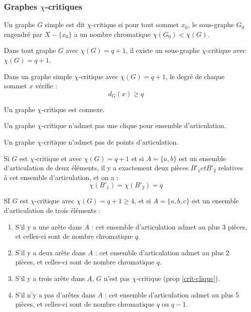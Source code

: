 \subsubsection{Graphes $\chi$-critiques}
\setcounter{prop}{0}

\begin{defin}
Un graphe $G$ simple est dit $\chi$-critique si pour tout sommet $x_0$, le sous-graphe $G_0$
engendré par $X-\{x_0\}$ a un nombre chromatique $\chi(G_0) < \chi(G)$.
\end{defin}

\begin{prop}
Dans tout graphe $G$ avec $\chi(G)=q+1$, il existe un sous-graphe $\chi$-critique avec $\chi(G)=q+1$.
\end{prop}

\begin{prop}
Dans un graphe simple $\chi$-critique avec $\chi(G)=q+1$, le degré de chaque sommet $x$ vérifie :
$$d_G(x)\geq q$$
\end{prop}

\begin{prop}
Un graphe $\chi$-critique est connexe.
\end{prop}

\begin{prop}\label{crit-clique}
Un graphe $\chi$-critique n'admet pas une clique pour ensemble d'articulation.
\end{prop}

\begin{prop}
Un graphe $\chi$-critique n'admet pas de points d'articulation.
\end{prop}

\begin{prop}
Si $G$ est $\chi$-critique et avec $\chi(G)=q+1$ et si $A=\{a,b\}$ est un ensemble d'articulation
de deux éléments, il y a exactement deux pièces $B'_1 et B'_2$ relatives à cet ensemble d'articulation, et on a :
$$\chi(B'_1)=\chi(B'_2)=q$$
\end{prop}

\begin{prop}
SI $G$ est $\chi$-critique avec $\chi(G)=q+1\geq 4$, et si $A=\{a,b,c\}$ est un ensemble
d'articulation de trois éléments :
\begin{enumerate}
 \item S'il y a une arête dans $A$ : cet ensemble d'articulation admet au plus 3 pièces,
et celles-ci sont de nombre chromatique $q$.
 \item S'il y a deux arête dans $A$ : cet ensemble d'articulation admet au plus 2 pièces,
et celles-ci sont de nombre chromatique $q$.
 \item S'il y a trois arête dans $A$, $G$ n'est pas $\chi$-critique (prop \ref{crit-clique}).
 \item S'il n'y a pas d'arêtes dans $A$ : cet ensemble d'articulation admet au plus 5 pièces,
et celles-ci sont de nombre chromatique $q$ ou $q-1$.
\end{enumerate}
\end{prop}

